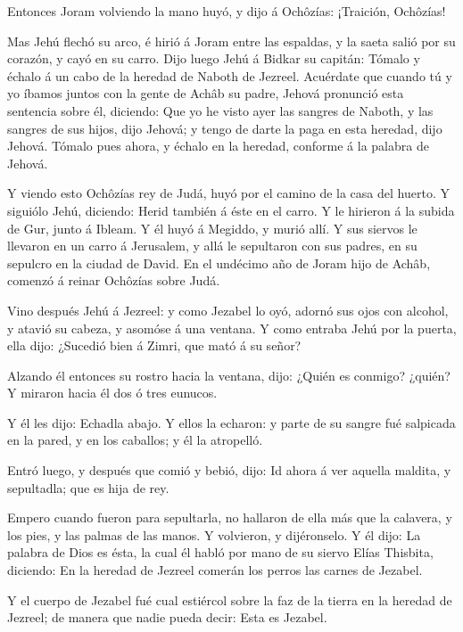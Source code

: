  Entonces Joram volviendo la mano huyó, y dijo á Ochôzías:
¡Traición, Ochôzías!

 Mas Jehú flechó su arco, é hirió á Joram entre las
espaldas, y la saeta salió por su corazón, y cayó en su carro.
 Dijo luego Jehú á Bidkar su capitán: Tómalo y échalo á un
cabo de la heredad de Naboth de Jezreel. Acuérdate que cuando tú y yo
íbamos juntos con la gente de Achâb su padre, Jehová pronunció esta
sentencia sobre él, diciendo:  Que yo he visto ayer las
sangres de Naboth, y las sangres de sus hijos, dijo Jehová; y tengo de
darte la paga en esta heredad, dijo Jehová. Tómalo pues ahora, y échalo
en la heredad, conforme á la palabra de Jehová.

 Y viendo esto Ochôzías rey de Judá, huyó por el camino de
la casa del huerto. Y siguiólo Jehú, diciendo: Herid también á éste en
el carro. Y le hirieron á la subida de Gur, junto á Ibleam. Y él huyó á
Megiddo, y murió allí.  Y sus siervos le llevaron en un
carro á Jerusalem, y allá le sepultaron con sus padres, en su sepulcro
en la ciudad de David.  En el undécimo año de Joram hijo de
Achâb, comenzó á reinar Ochôzías sobre Judá.

 Vino después Jehú á Jezreel: y como Jezabel lo oyó, adornó
sus ojos con alcohol, y atavió su cabeza, y asomóse á una ventana.
 Y como entraba Jehú por la puerta, ella dijo: ¿Sucedió
bien á Zimri, que mató á su señor?

 Alzando él entonces su rostro hacia la ventana, dijo:
¿Quién es conmigo? ¿quién? Y miraron hacia él dos ó tres eunucos.

 Y él les dijo: Echadla abajo. Y ellos la echaron: y parte
de su sangre fué salpicada en la pared, y en los caballos; y él la
atropelló.

 Entró luego, y después que comió y bebió, dijo: Id ahora á
ver aquella maldita, y sepultadla; que es hija de rey.

 Empero cuando fueron para sepultarla, no hallaron de ella
más que la calavera, y los pies, y las palmas de las manos.
 Y volvieron, y dijéronselo. Y él dijo: La palabra de Dios
es ésta, la cual él habló por mano de su siervo Elías Thisbita,
diciendo: En la heredad de Jezreel comerán los perros las carnes de
Jezabel.

 Y el cuerpo de Jezabel fué cual estiércol sobre la faz de
la tierra en la heredad de Jezreel; de manera que nadie pueda decir:
Esta es Jezabel.


